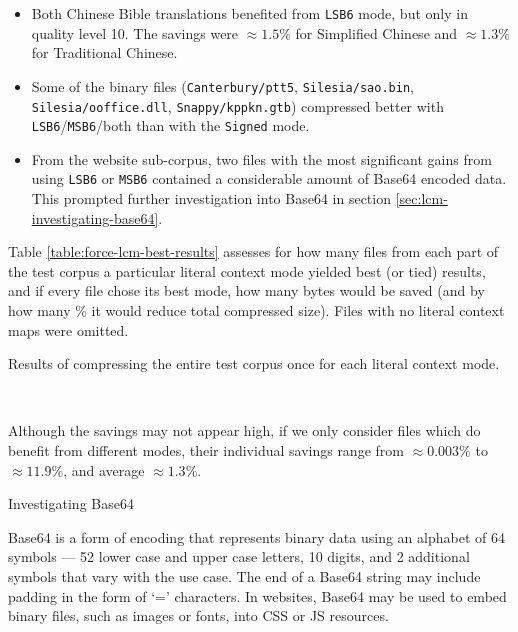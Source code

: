 \documentclass[english,master,dept460,male,cpp,cpdeclaration]{diploma}
\makeatletter
\renewcommand\paragraph
	{\@startsection{paragraph}{4}{\z@}
	{-3.25ex plus 1ex minus .2ex}
	{1.5ex plus .2ex}
	{\normalfont\normalsize\bfseries}}
\newcommand{\subfoursection}[1]{\paragraph{#1}}
\newcommand{\nosep}{\itemsep0em}
\newcommand{\texfigure}[1]{
}
\makeatother
\begin{document}
		\begin{itemize} \nosep
			\item Both Chinese Bible translations benefited from \verb|LSB6| mode, but only in quality level 10. The savings were $\approx 1.5 \%$ for Simplified Chinese and $\approx 1.3 \%$ for Traditional Chinese.
			\item Some of the binary files (\verb|Canterbury/ptt5|, \verb|Silesia/sao.bin|, \verb|Silesia/ooffice.dll|, \verb|Snappy/kppkn.gtb|) compressed better with \verb|LSB6|/\verb|MSB6|/both than with the \verb|Signed| mode.
			\item From the website sub-corpus, two files with the most significant gains from using \verb|LSB6| or \verb|MSB6| contained a considerable amount of Base64 encoded data. This prompted further investigation into Base64 in section \ref{sec:lcm-investigating-base64}.
		\end{itemize}
		
		\noindent
		Table \ref{table:force-lcm-best-results} assesses for how many files from each part of the test corpus a particular literal context mode yielded best (or tied) results, and if every file chose its best mode, how many bytes would be saved (and by how many \% it would reduce total compressed size). Files with no literal context maps were omitted.
		
		\begin{table}[H]
			\centering
			\caption{Results of compressing the entire test corpus once for each literal context mode.}
			\label{table:force-lcm-best-results}
			\texfigure{force-lcm-best-results}
			\\[-6pt]
		\end{table}
		
		\noindent
		Although the savings may not appear high, if we only consider files which do benefit from different modes, their individual savings range from $\approx 0.003 \%$ to $\approx 11.9 \%$, and average $\approx 1.3 \%$.
		
			\subfoursection{Investigating Base64}
			\label{sec:lcm-investigating-base64}
			
			Base64 is a form of encoding that represents binary data using an alphabet of 64 symbols --- 52 lower case and upper case letters, 10 digits, and 2 additional symbols that vary with the use case. The end of a Base64 string may include padding in the form of \enquote*{=} characters. In websites, Base64 may be used to embed binary files, such as images or fonts, into CSS or JS resources.\cite{DataUrlBase64}
			
\end{document}
